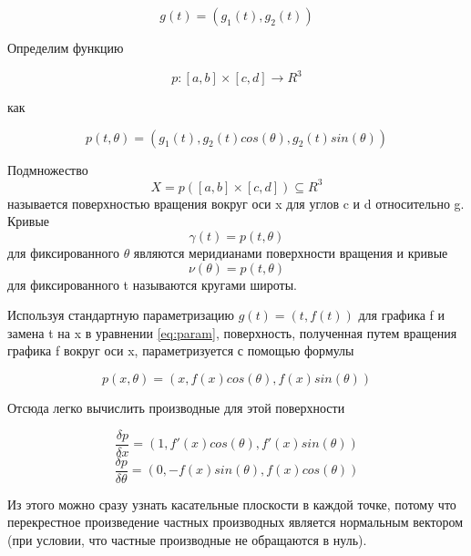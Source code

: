 \begin{equation}
    g(t) = (g_1(t), g_2(t))
\end{equation}

Определим функцию

\begin{equation}
    p: [a, b] \times [c, d] \longrightarrow R^3
\end{equation}

как

\begin{equation}
    p(t, \theta) = (g_1(t), g_2(t)cos(\theta), g_2(t)sin(\theta))\label{eq:param}
\end{equation}

Подмножество
\begin{equation}
    X = p([a, b] \times [c, d]) \subseteq R^3
\end{equation}
называется поверхностью вращения вокруг оси x для углов c и d относительно g.\newline
Кривые
\begin{equation}
    \gamma(t) = p(t, \theta)
\end{equation}
для фиксированного \(\theta\) являются меридианами поверхности вращения и кривые
\begin{equation}
    \nu(\theta) = p(t, \theta)
\end{equation}
для фиксированного t называются кругами широты.\newline

Используя стандартную параметризацию \(g(t) = (t,f(t))\) для
графика f и замена t на x в уравнении \ref{eq:param}, поверхность, полученная путем вращения графика f вокруг оси x,
параметризуется с помощью формулы

\begin{equation}
    p(x, \theta) = (x, f(x)cos(\theta), f(x)sin(\theta))
\end{equation}

Отсюда легко вычислить производные для этой поверхности

\begin{equation}
    \frac{\delta p}{\delta x} = (1, f'(x)cos(\theta), f'(x)sin(\theta))
\end{equation}
\begin{equation}
    \frac{\delta p}{\delta \theta} = (0, -f(x)sin(\theta), f(x)cos(\theta))
\end{equation}

Из этого можно сразу узнать касательные плоскости в каждой точке,
потому что перекрестное произведение частных производных является нормальным вектором
(при условии, что частные производные не обращаются в нуль).

